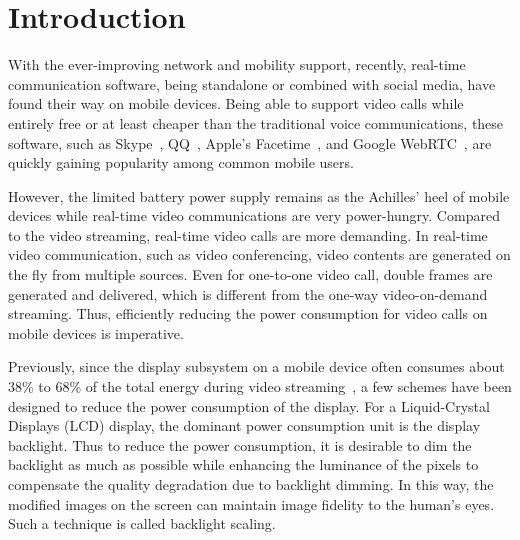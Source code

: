 \section{Introduction}

With the ever-improving network and mobility support, recently,
real-time communication software, being standalone or combined with
social media, have found their way on mobile devices.  Being able
to support video calls while entirely free or at least cheaper than
the traditional voice communications, these software, such as
Skype~\cite{skype}, QQ~\cite{qq}, Apple's Facetime~\cite{facetime},
and Google WebRTC~\cite{webrtcproject}, are quickly gaining popularity
among common mobile users.

However, the limited battery power supply remains as the Achilles'
heel of mobile devices while real-time video communications are very
power-hungry. Compared to the video streaming, real-time video calls
are more demanding. In real-time video communication, such as 
video conferencing, video contents are generated on the fly from
multiple sources. Even for one-to-one video call, double frames
are generated and delivered, which is different from the one-way video-on-demand streaming. 
Thus, efficiently reducing the power consumption for video calls on mobile devices is
imperative.

Previously, since the display subsystem on a mobile device often
consumes about 38\% to 68\% of the total energy during video
streaming~\cite{AG10}, a few schemes have been designed to reduce the
power consumption of the display. For a Liquid-Crystal Displays (LCD)
display, the dominant power consumption unit is the display backlight. 
Thus to reduce the power consumption, it is desirable to
dim the backlight as much as possible while enhancing the luminance of
the pixels to compensate the quality degradation due to backlight
dimming.  In this way, the modified images on the screen can maintain
image fidelity to the human's eyes. Such a technique is called
backlight scaling.

